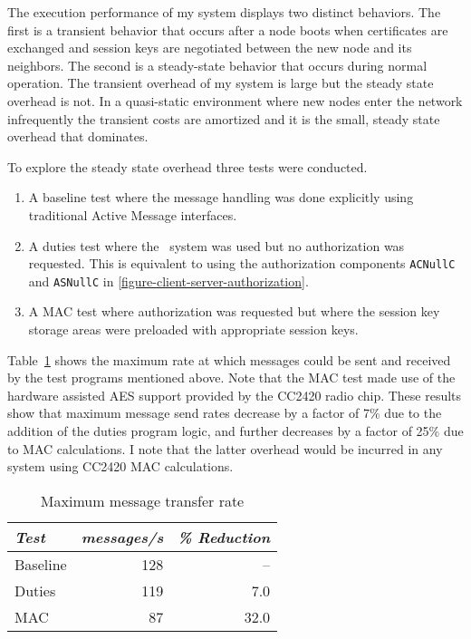 The execution performance of my system displays two distinct behaviors. The first is a transient
behavior that occurs after a node boots when certificates are exchanged and session keys are
negotiated between the new node and its neighbors. The second is a steady-state behavior that
occurs during normal operation. The transient overhead of my system is large but the steady
state overhead is not. In a quasi-static environment where new nodes enter the network
infrequently the transient costs are amortized and it is the small, steady state overhead that
dominates.

To explore the steady state overhead three tests were conducted.
\begin{enumerate}
\item A baseline test where the message handling was done explicitly using traditional Active
  Message interfaces.
\item A duties test where the \Sprocket\ system was used but no authorization was requested.
  This is equivalent to using the authorization components \texttt{ACNullC} and \texttt{ASNullC}
  in \autoref{figure-client-server-authorization}.
\item A MAC test where authorization was requested but where the session key storage areas were
  preloaded with appropriate session keys.
\end{enumerate}

Table~\ref{table-steady-state} shows the maximum rate at which messages could be sent and
received by the test programs mentioned above. Note that the MAC test made use of the hardware
assisted AES support provided by the CC2420 radio chip. These results show that maximum message
send rates decrease by a factor of 7\% due to the addition of the duties program logic, and
further decreases by a factor of 25\% due to MAC calculations. I note that the latter overhead
would be incurred in any system using CC2420 MAC calculations.

\begin{table}[!t]
  \newcommand\T{\rule{0pt}{2.1ex}}
  \centering
  \caption{Maximum message transfer rate}
  {
  \begin{tabular}{|l|r|r|} \hline
    \textit{Test} \T & \textit{messages/s} & \textit{\% Reduction} \\
    \hline \hline

    Baseline \T & 128 &   -- \\ \hline 
    Duties   \T & 119 &  7.0 \\ \hline
    MAC      \T &  87 & 32.0 \\ \hline
  \end{tabular}
  }
  \label{table-steady-state}
\end{table}

